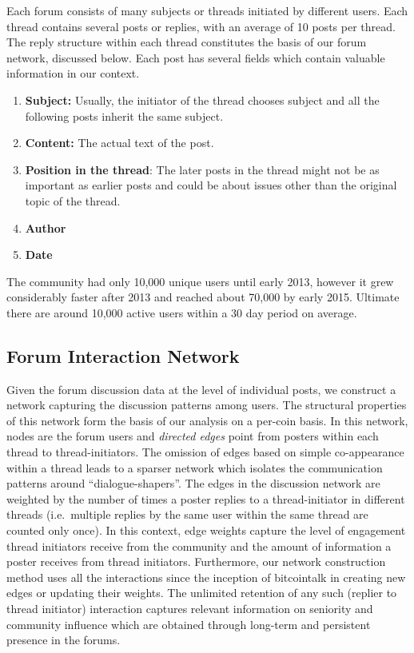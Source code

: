 Each forum consists of many subjects or threads initiated by different users.
Each thread contains several posts or replies, with an average of 10 posts per
thread.  The reply structure within each thread constitutes the basis of our
forum network, discussed below.  Each post has several fields which contain
valuable information in our context.
\begin{enumerate}[topsep=0pt,itemsep=-0.5ex,partopsep=1ex,parsep=1ex]
  \item \textbf{Subject:} Usually, the initiator of the thread chooses subject and all the
    following posts inherit the same subject.
  \item \textbf{Content:} The actual text of the post.
  \item \textbf{Position in the thread}: The later posts in the thread might not be as important
    as earlier posts and could be about issues other than the original topic of the thread.
  \item \textbf{Author}
  \item \textbf{Date}
\end{enumerate}
The community had only 10,000 unique users until early 2013, however it grew considerably faster after 2013 and reached about 70,000 by early 2015.
Ultimate there are around 10,000 active users within a 30 day period on average.

\subsection{Forum Interaction Network}

Given the forum discussion data at the level of individual posts, we  construct a network capturing the discussion patterns among users. The structural properties of this network form the basis of our analysis on a per-coin basis. In this network, nodes are the forum users and \textit{directed edges} point from posters within each thread to thread-initiators. The omission of edges based on simple co-appearance within a thread leads to a sparser network which isolates the communication patterns around ``dialogue-shapers''. The edges in the discussion network are weighted by the number of times a poster replies to a thread-initiator in different threads (i.e.~multiple replies by the same user within the same thread are counted only once).
In this context, edge weights capture the level of engagement thread initiators receive from the community and the amount of information a poster receives from thread initiators. Furthermore, our network construction method uses all the interactions since the inception of bitcointalk in creating new edges or updating their weights. The unlimited retention of any such (replier to thread initiator) interaction captures relevant information on seniority and community influence which are obtained through long-term and persistent presence in the forums. 

